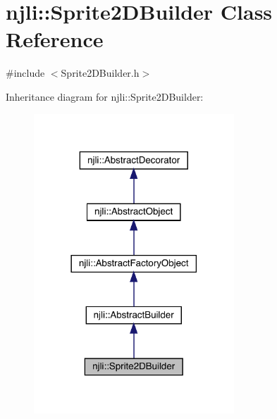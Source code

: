 \hypertarget{classnjli_1_1_sprite2_d_builder}{}\section{njli\+:\+:Sprite2\+D\+Builder Class Reference}
\label{classnjli_1_1_sprite2_d_builder}


{\ttfamily \#include $<$Sprite2\+D\+Builder.\+h$>$}



Inheritance diagram for njli\+:\+:Sprite2\+D\+Builder\+:\nopagebreak
\begin{figure}[H]
\begin{center}
\leavevmode
\includegraphics[width=213pt]{classnjli_1_1_sprite2_d_builder__inherit__graph}
\end{center}
\end{figure}


